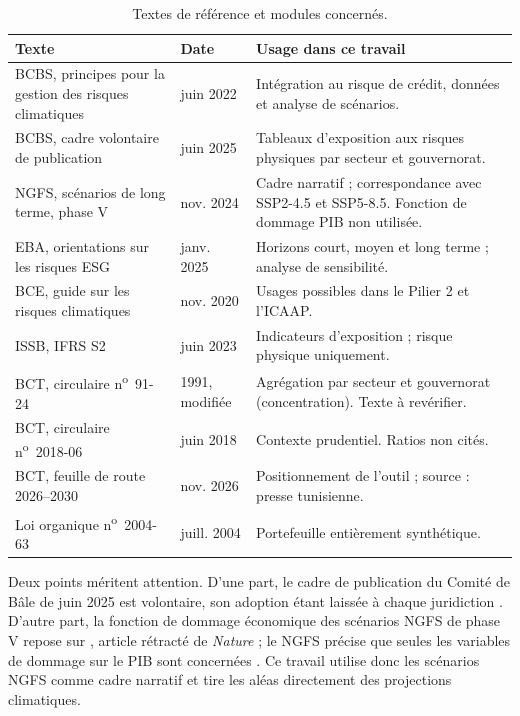 \documentclass[11pt,a4paper]{article}
\begin{document}
\begin{table}[ht]
\centering\small
\caption{Textes de référence et modules concernés.}\label{tab:cadre}
\begin{tabular}{@{}p{4.3cm}p{2.6cm}p{6.6cm}@{}}
\toprule
Texte & Date & Usage dans ce travail \\
\midrule
BCBS, principes pour la gestion des risques climatiques & juin 2022 & Intégration au risque de crédit, données et analyse de scénarios. \\
BCBS, cadre volontaire de publication & juin 2025 & Tableaux d'exposition aux risques physiques par secteur et gouvernorat. \\
NGFS, scénarios de long terme, phase V & nov. 2024 & Cadre narratif ; correspondance avec SSP2-4.5 et SSP5-8.5. Fonction de dommage PIB non utilisée. \\
EBA, orientations sur les risques ESG & janv. 2025 & Horizons court, moyen et long terme ; analyse de sensibilité. \\
BCE, guide sur les risques climatiques & nov. 2020 & Usages possibles dans le Pilier 2 et l'ICAAP. \\
ISSB, IFRS S2 & juin 2023 & Indicateurs d'exposition ; risque physique uniquement. \\
BCT, circulaire n\textsuperscript{o}~91-24 & 1991, modifiée & Agrégation par secteur et gouvernorat (concentration). Texte à revérifier. \\
BCT, circulaire n\textsuperscript{o}~2018-06 & juin 2018 & Contexte prudentiel. Ratios non cités. \\
BCT, feuille de route 2026--2030 & nov. 2026 & Positionnement de l'outil ; source : presse tunisienne. \\
Loi organique n\textsuperscript{o}~2004-63 & juill. 2004 & Portefeuille entièrement synthétique. \\
\bottomrule
\end{tabular}
\end{table}

Deux points méritent attention. D'une part, le cadre de publication du Comité de Bâle de juin 2025 est volontaire, son adoption étant laissée à chaque juridiction \citep{bcbs2025}. D'autre part, la fonction de dommage économique des scénarios NGFS de phase V repose sur \citet{kotz2024}, article rétracté de \emph{Nature} ; le NGFS précise que seules les variables de dommage sur le PIB sont concernées \citep{ngfs2025}. Ce travail utilise donc les scénarios NGFS comme cadre narratif et tire les aléas directement des projections climatiques.
\end{document}
